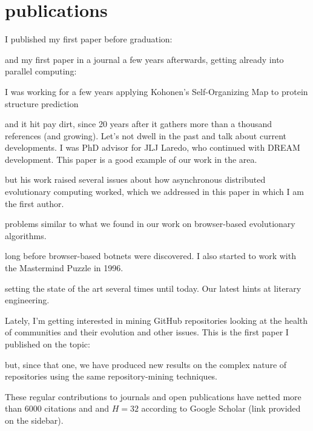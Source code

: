 \documentclass[]{friggeri-jj-cv}
\begin{document}
\section{publications}

I published my first paper before graduation: 

\cite{merelo88} 
and my first paper in a journal a few years
afterwards, getting already into parallel computing:

\cite{parallel90}
I was working for a few years applying Kohonen's Self-Organizing Map to protein structure prediction

\cite{jjproteng} 
and it hit pay dirt, since 20 years after it gathers more than a
thousand references (and growing). Let's not dwell in the past
and talk about current developments. I was PhD advisor for JLJ Laredo,
who continued with DREAM development. This paper is a good example of
our work in the area.

\cite{evag:gpem}
but his work raised several issues about how asynchronous distributed
evolutionary computing worked, which we addressed in this paper in
which I am the first author.

\cite{jj:2008:PPSN}
problems similar to what we found in our work on browser-based
evolutionary algorithms.

\cite{agajaj}
long before browser-based botnets were discovered. I also started to
work with the Mastermind Puzzle in 1996.

\cite{jj-ppsn96}
setting the state of the art several times until today. Our latest hints at 
literary engineering.

\cite{2014arXiv1403.3084G}

Lately, I'm getting interested in mining GitHub repositories looking
at the health of communities and their evolution and other
issues. This is the first paper I published on the topic:

\cite{2016arXiv160107862M}

but, since that one, we have produced new results on the complex
nature of repositories using the same repository-mining techniques.

These regular contributions to journals and open publications have
netted more than 6000 citations and and $H=32$ according to Google Scholar (link provided on
the sidebar).
\end{document}
